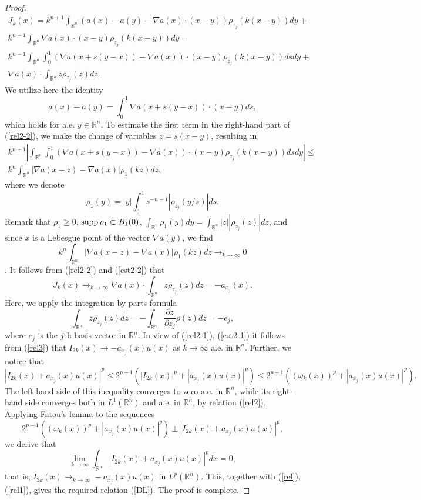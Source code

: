 \documentclass[12pt]{article}
\newcommand{\R}{{\mathbb R}}
\newcommand{\supp}{\mathop{\rm supp}}
\numberwithin{equation}{section}
\theoremstyle{plain}
\theoremstyle{definition}
\begin{document}
\begin{proof}
\begin{align}\label{rel2-2}
J_k(x)=k^{n+1}\int_{\R^n}(a(x)-a(y)-\nabla a(x)\cdot(x-y))\rho_{z_j}(k(x-y))dy+\nonumber\\ k^{n+1}\int_{\R^n}\nabla a(x)\cdot (x-y)\rho_{z_j}(k(x-y))dy=\nonumber\\
k^{n+1}\int_{\R^n}\int_0^1 (\nabla a(x+s(y-x))-\nabla a(x))\cdot(x-y)\rho_{z_j}(k(x-y))dsdy+\nonumber\\ \nabla a(x)\cdot\int_{\R^n}z\rho_{z_j}(z)dz.
\end{align}
We utilize here the identity
\[
a(x)-a(y)=\int_0^1\nabla a(x+s(y-x))\cdot(x-y)ds,
\]
which holds for a.e. $y\in\R^n$.
To estimate the first term in the right-hand part of (\ref{rel2-2}), we make the change of variables $z=s(x-y)$, resulting in
\begin{align}\label{est2-2}
k^{n+1}\left|\int_{\R^n}\int_0^1 (\nabla a(x+s(y-x))-\nabla a(x))\cdot(x-y)\rho_{z_j}(k(x-y))dsdy\right|\le\nonumber\\
k^n\int_{\R^n} |\nabla a(x-z)-\nabla a(x)|\rho_1(kz)dz,
\end{align}
where we denote
\[
\rho_1(y)=|y|\int_0^1s^{-n-1}|\rho_{z_j}(y/s)|ds.
\]
Remark that $\rho_1\ge 0$, $\supp\rho_1\subset B_1(0)$, $\displaystyle\int_{\R^n}\rho_1(y)dy=\int_{\R^n}|z||\rho_{z_j}(z)|dz$, and since $x$ is a Lebesgue point of the vector $\nabla a(y)$, we find
\[k^n\int_{\R^n} |\nabla a(x-z)-\nabla a(x)|\rho_1(kz)dz\mathop{\to}_{k\to\infty} 0\].
It follows from (\ref{rel2-2}) and (\ref{est2-2}) that
\begin{equation} \label{rel3}
J_k(x)\mathop{\to}_{k\to\infty} \nabla a(x)\cdot\int_{\R^n}z\rho_{z_j}(z)dz=-a_{x_j}(x).
\end{equation}
Here, we apply the integration by parts formula
\[\int_{\R^n}z\rho_{z_j}(z)dz=-\int_{\R^n}\frac{\partial z}{\partial z_j}\rho(z)dz=-e_j, \]
where $e_j$ is the $j$th basis vector in $\R^n$.
In view of (\ref{rel2-1}), (\ref{est2-1}) it follows from (\ref{rel3}) that $I_{2k}(x)\to -a_{x_j}(x)u(x)$ as $k\to\infty$ a.e. in $\R^n$. Further, we notice that
\[
|I_{2k}(x)+a_{x_j}(x)u(x)|^p\le 2^{p-1}(|I_{2k}(x)|^p+|a_{x_j}(x)u(x)|^p)\le 2^{p-1}((\omega_k(x))^p+|a_{x_j}(x)u(x)|^p).\]
The left-hand side of this inequality converges to zero a.e. in $\R^n$, while its right-hand side converges both in  $L^1(\R^n)$ and a.e. in $\R^n$, by relation (\ref{rel2}). Applying Fatou's lemma to the sequences
\[
2^{p-1}((\omega_k(x))^p+|a_{x_j}(x)u(x)|^p)\pm |I_{2k}(x)+a_{x_j}(x)u(x)|^p,
\]
we derive that
\[
\lim_{k\to\infty} \int_{\R^n}|I_{2k}(x)+a_{x_j}(x)u(x)|^pdx=0,
\]
that is, $\displaystyle I_{2k}(x)\mathop{\to}_{k\to\infty} -a_{x_j}(x)u(x)$ in $L^p(\R^n)$. This, together with  (\ref{rel}), (\ref{rel1}), gives the required relation (\ref{DL}). The proof is complete.
\end{proof}
\end{document}
